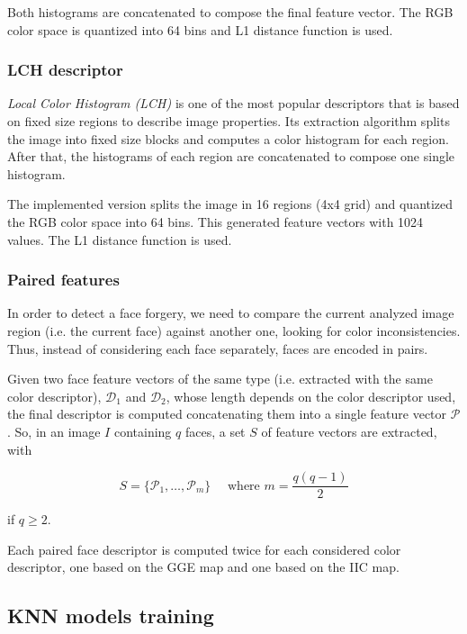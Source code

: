 Both histograms are concatenated to compose the final feature vector. The RGB color space is quantized into 64 bins and L1 distance function is used.

\subsubsection{LCH descriptor}

\emph{Local Color Histogram (LCH)} \cite{swain1991color} is one of the most popular descriptors that is based on fixed size regions to describe image properties. Its extraction algorithm splits the image into fixed size blocks and computes a color histogram for each region. After that, the histograms of each region
are concatenated to compose one single histogram. 

The implemented version splits the image
in 16 regions (4x4 grid) and quantized the RGB color space into 64 bins. This generated feature vectors with 1024 values. The L1 distance function is used.


\subsubsection{Paired features}

In order to detect a face forgery, we need to compare the current analyzed image region (i.e. the current face) against another one, looking for color inconsistencies. Thus, instead of considering each face separately, faces are encoded in pairs.

Given two face feature vectors of the same type (i.e. extracted with the same color descriptor), $\mathcal{D}_1$ and $\mathcal{D}_2$, whose length depends on the color descriptor used, the final descriptor is computed concatenating them into a single feature vector $\mathcal{P}$. So, in an image $I$ containing $q$ faces, a set $S$ of feature vectors are extracted, with

$$
S = \{\mathcal{P}_1, \ldots, \mathcal{P}_m\} \quad \textrm{  where } m = \frac{q (q-1)}{2}
$$

if $q \geq 2$. 

Each paired face descriptor is computed twice for each considered color descriptor, one based on the GGE map and one based on the IIC map.

\subsection{KNN models training}

